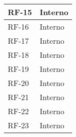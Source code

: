 \begin{longtable}{|>{\centering\arraybackslash}m{}|>{\centering\arraybackslash}m{}|}
	RF-15              & Interno                                                                                                                                                                                                                                              \\\hline
	RF-16              & Interno                                                                                                                                                                                                                                              \\\hline
	RF-17              & Interno                                                                                                                                                                                                                                              \\\hline
	RF-18              & Interno                                                                                                                                                                                                                                              \\\hline
	RF-19              & Interno                                                                                                                                                                                                                                              \\\hline
	RF-20              & Interno                                                                                                                                                                                                                                              \\\hline
	RF-21              & Interno                                                                                                                                                                                                                                              \\\hline
	RF-22              & Interno                                                                                                                                                                                                                                              \\\hline
	RF-23              & Interno                                                                                                                                                                                                                                              \\\hline

\end{longtable}
